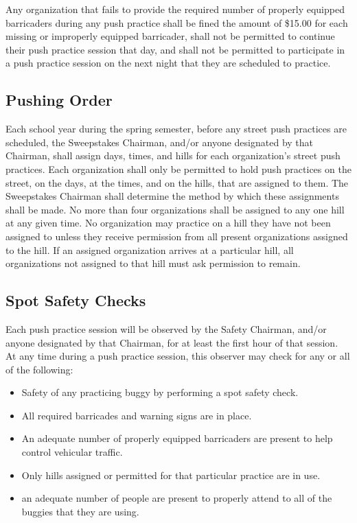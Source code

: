 	Any organization that fails to provide the required number of properly equipped barricaders during any push practice shall be fined the amount of \$15.00 for each missing or improperly equipped barricader, shall not be permitted to continue their push practice session that day, and shall not be permitted to participate in a push practice session on the next night that they are scheduled to practice.

\subsection{Pushing Order}

	Each school year during the spring semester, before any street push practices are scheduled, the Sweepstakes Chairman, and/or anyone designated by that Chairman, shall assign days, times, and hills for each organization's street push practices. Each organization shall only be permitted to hold push practices on the street, on the days, at the times, and on the hills, that are assigned to them. The Sweepstakes Chairman shall determine the method by which these assignments shall be made. No more than four organizations shall be assigned to any one hill at any given time. No organization may practice on a hill they have not been assigned to unless they receive permission from all present organizations assigned to the hill. If an assigned organization arrives at a particular hill, all organizations not assigned to that hill must ask permission to remain.

\subsection{Spot Safety Checks}

	Each push practice session will be observed by the Safety Chairman, and/or anyone designated by that Chairman, for at least the first hour of that session. At any time during a push practice session, this observer may check for any or all of the following:

	\begin{itemize}

		\item Safety of any practicing buggy by performing a spot safety check.

		\item All required barricades and warning signs are in place.

		\item An adequate number of properly equipped barricaders are present to help control vehicular traffic.

		\item Only hills assigned or permitted for that particular practice are in use.

		\item an adequate number of people are present to properly attend to all of the buggies that they are using.

	\end{itemize}


